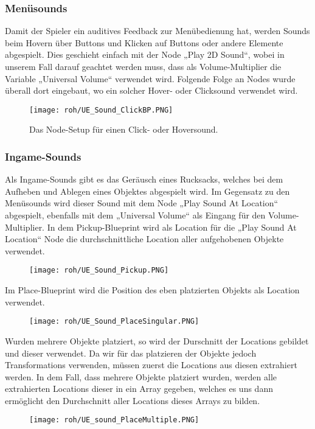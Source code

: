 \subsubsection{Menüsounds}
Damit der Spieler ein auditives Feedback zur Menübedienung hat, werden Sounds beim Hovern über Buttons und Klicken auf Buttons oder andere Elemente abgespielt. Dies geschieht einfach mit der Node „Play 2D Sound“, wobei in unserem Fall darauf geachtet werden muss, dass als Volume-Multiplier die Variable „Universal Volume“ verwendet wird. Folgende Folge an Nodes wurde überall dort eingebaut, wo ein solcher Hover- oder Clicksound verwendet wird.
\begin{figure}[H]
    \centering
    \texttt{[image: roh/UE\_Sound\_ClickBP.PNG]}
    \caption{Das Node-Setup für einen Click- oder Hoversound.}
    \label{UE:Sound_ClickBP}
\end{figure}
\subsubsection{Ingame-Sounds}
Als Ingame-Sounds gibt es das Geräusch eines Rucksacks, welches bei dem Aufheben und Ablegen eines Objektes abgespielt wird. Im Gegensatz zu den Menüsounds wird dieser Sound mit dem Node „Play Sound At Location“ abgespielt, ebenfalls mit dem „Universal Volume“ als Eingang für den Volume-Multiplier. In dem Pickup-Blueprint wird als Location für die „Play Sound At Location“ Node die durchschnittliche Location aller aufgehobenen Objekte verwendet.
\begin{figure}[H]
    \centering
    \texttt{[image: roh/UE\_Sound\_Pickup.PNG]}
    \label{UE:Sound_Pickup}
\end{figure}
Im Place-Blueprint wird die Position des eben platzierten Objekts als Location verwendet.
\begin{figure}[H]
    \centering
    \texttt{[image: roh/UE\_Sound\_PlaceSingular.PNG]}
    \label{UE:Sound_PlaceSingular}
\end{figure}
Wurden mehrere Objekte platziert, so wird der Durschnitt der Locations gebildet und dieser verwendet. Da wir für das platzieren der Objekte jedoch Transformations verwenden, müssen zuerst die Locations aus diesen extrahiert werden. In dem Fall, dass mehrere Objekte platziert wurden, werden alle extrahierten Locations dieser in ein Array gegeben, welches es uns dann ermöglicht den Durchschnitt aller Locations dieses Arrays zu bilden.
\begin{figure}[H]
    \centering
    \texttt{[image: roh/UE\_sound\_PlaceMultiple.PNG]}
    \label{UE:sound_PlaceMultiple}
\end{figure}

